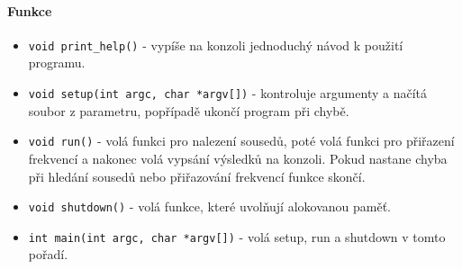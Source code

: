 \documentclass[12pt]{article}
\begin{document}
\paragraph{Funkce}
%
\begin{itemize}
	\item \texttt{void print\_help()} - vypíše na konzoli jednoduchý
		návod k použití programu.
	\item \texttt{void setup(int argc, char *argv[])} - kontroluje
		argumenty a načítá soubor z parametru, popřípadě ukončí
		program při chybě.
	\item \texttt{void run()} - volá funkci pro nalezení sousedů, poté volá
		funkci pro přiřazení frekvencí a nakonec volá vypsání výsledků
		na konzoli. Pokud nastane chyba při hledání sousedů nebo 
		přiřazování frekvencí funkce skončí.
	\item \texttt{void shutdown()} - volá funkce, které uvolňují alokovanou
		paměť.
	\item \texttt{int main(int argc, char *argv[])} - volá setup, run a 
		shutdown v tomto pořadí.
\end{itemize}
%
\end{document}

